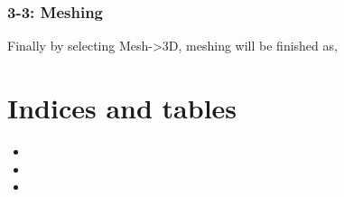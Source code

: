 \documentclass[letterpaper,10pt,english]{sphinxmanual}
\begin{document}
\subsection{3-3: Meshing}
\label{\detokenize{meshing:id4}}
Finally by selecting Mesh-\textgreater{}3D, meshing will be finished as,




\chapter{Indices and tables}
\label{\detokenize{index:indices-and-tables}}\begin{itemize}
\item {} 

\item {} 

\item {} 

\end{itemize}



\renewcommand{\indexname}{Index}
\printindex
\end{document}
